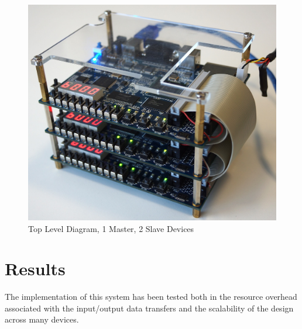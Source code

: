 \documentclass[conference]{IEEEtran}
\begin{document}
\begin{center}
\begin{figure}
  \includegraphics[width=\columnwidth]{./figs/cluster.JPG}
  \caption{Top Level Diagram, 1 Master, 2 Slave Devices}
  \label{fig:de0}
\end{figure}
\end{center}


\section{Results}

The implementation of this system has been tested both in the resource overhead associated with the input/output data transfers and the scalability of the design across many devices. 
\end{document}
